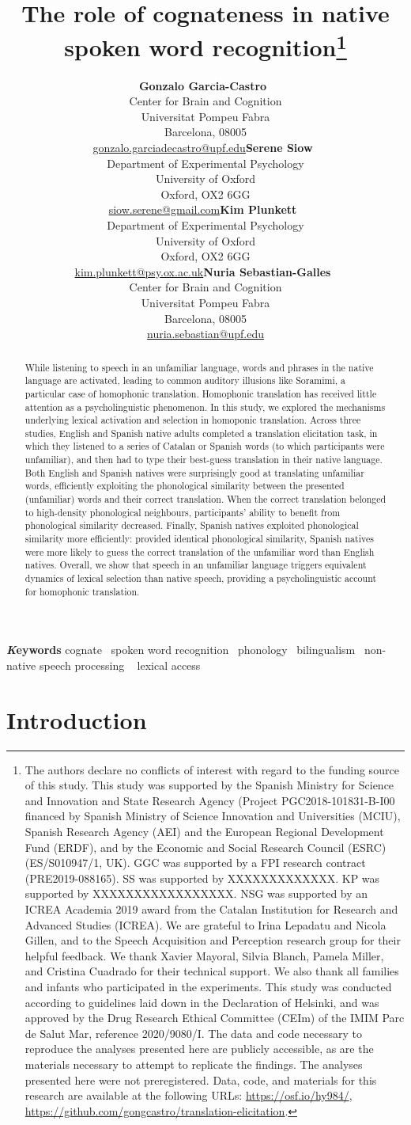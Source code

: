 \documentclass[
]{article}
\title{The role of cognateness in native spoken word
recognition\thanks{The authors declare no conflicts of interest with
regard to the funding source of this study. This study was supported by
the Spanish Ministry for Science and Innovation and State Research
Agency (Project PGC2018-101831-B-I00 financed by Spanish Ministry of
Science Innovation and Universities (MCIU), Spanish Research Agency
(AEI) and the European Regional Development Fund (ERDF), and by the
Economic and Social Research Council (ESRC) (ES/S010947/1, UK). GGC was
supported by a FPI research contract (PRE2019-088165). SS was supported
by XXXXXXXXXXXXX. KP was supported by XXXXXXXXXXXXXXXXX. NSG was
supported by an ICREA Academia 2019 award from the Catalan Institution
for Research and Advanced Studies (ICREA). We are grateful to Irina
Lepadatu and Nicola Gillen, and to the Speech Acquisition and Perception
research group for their helpful feedback. We thank Xavier Mayoral,
Silvia Blanch, Pamela Miller, and Cristina Cuadrado for their technical
support. We also thank all families and infants who participated in the
experiments. This study was conducted according to guidelines laid down
in the Declaration of Helsinki, and was approved by the Drug Research
Ethical Committee (CEIm) of the IMIM Parc de Salut Mar, reference
2020/9080/I. The data and code necessary to reproduce the analyses
presented here are publicly accessible, as are the materials necessary
to attempt to replicate the findings. The analyses presented here were
not preregistered. Data, code, and materials for this research are
available at the following URLs: \url{https://osf.io/hy984/},
\url{https://github.com/gongcastro/translation-elicitation}.}}
\author{\textbf{Gonzalo
Garcia-Castro}~\orcidlink{0000-0002-8553-4209}\\Center for Brain and
Cognition\\Universitat Pompeu Fabra\\Barcelona,
08005\\\href{mailto:gonzalo.garciadecastro@upf.edu}{gonzalo.garciadecastro@upf.edu}\asep\textbf{Serene
Siow}~\orcidlink{0000-0001-6482-2191}\\Department of Experimental
Psychology\\University of Oxford\\Oxford, OX2
6GG\\\href{mailto:siow.serene@gmail.com}{siow.serene@gmail.com}\asep\textbf{Kim
Plunkett}~\orcidlink{0000-0003-0216-7480}\\Department of Experimental
Psychology\\University of Oxford\\Oxford, OX2
6GG\\\href{mailto:kim.plunkett@psy.ox.ac.uk}{kim.plunkett@psy.ox.ac.uk}\asep\textbf{Nuria
Sebastian-Galles}~\orcidlink{0000-0001-6938-2498}\\Center for Brain and
Cognition\\Universitat Pompeu Fabra\\Barcelona,
08005\\\href{mailto:nuria.sebastian@upf.edu}{nuria.sebastian@upf.edu}}
\date{}
\begin{document}
\maketitle
\begin{abstract}
While listening to speech in an unfamiliar language, words and phrases
in the native language are activated, leading to common auditory
illusions like Soramimi, a particular case of homophonic translation.
Homophonic translation has received little attention as a
psycholinguistic phenomenon. In this study, we explored the mechanisms
underlying lexical activation and selection in homoponic translation.
Across three studies, English and Spanish native adults completed a
translation elicitation task, in which they listened to a series of
Catalan or Spanish words (to which participants were unfamiliar), and
then had to type their best-guess translation in their native language.
Both English and Spanish natives were surprisingly good at translating
unfamiliar words, efficiently exploiting the phonological similarity
between the presented (unfamiliar) words and their correct translation.
When the correct translation belonged to high-density phonological
neighbours, participants' ability to benefit from phonological
similarity decreased. Finally, Spanish natives exploited phonological
similarity more efficiently: provided identical phonological similarity,
Spanish natives were more likely to guess the correct translation of the
unfamiliar word than English natives. Overall, we show that speech in an
unfamiliar language triggers equivalent dynamics of lexical selection
than native speech, providing a psycholinguistic account for homophonic
translation.
\end{abstract}
{\bfseries \emph Keywords}
\def\sep{\textbullet\ }
cognate \sep spoken word
recognition \sep phonology \sep bilingualism \sep non-native speech
processing \sep 
lexical access



\section{Introduction}\label{introduction}
\end{document}
